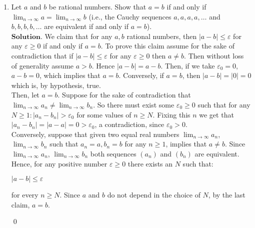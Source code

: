 \documentclass{article}
\theoremstyle{remark}
\begin{document}
\begin{enumerate}
        \item Let \( a \) and \( b \) be rational numbers. Show that \( a = b \) if and only if 
        \( \lim_{n \to \infty} a = \lim_{n \to \infty} b \) (i.e., the Cauchy sequences \( a, a, a, a, \dots \) and \( b, b, b, b, \dots \) are equivalent if and only if \( a = b \)).\\
        $\textbf{Solution.}$
        We claim that for any $a, b$ rational numbers, then $\left\lvert a-b\right\rvert \leq \varepsilon$ for any $\varepsilon \geq 0$ if and only
        if $a = b$. To prove this claim assume for the sake of contradiction that if 
        $\left\lvert a-b\right\rvert \leq \varepsilon$ for any $\varepsilon \geq 0$ then $a \neq b$.
        Then without loss of generality assume $a > b$. Hence $\left\lvert a-b\right\rvert = a-b$. Then, if we take $\varepsilon_0 = 0$,
        $a - b = 0$, which implies that $a = b$.
        Conversely, if $a=b$, then $\left\lvert a-b\right\rvert = \left\lvert 0\right\rvert = 0$
        which is, by hypothesis, true.\\
        Then, let $a = b$. Suppose for the sake of contradiction that $\lim_{n\to \infty}a_n \neq \lim_{n\to \infty}b_n$.
        So there must exist some $\varepsilon_0 \geq 0$ such that for any $N \geq 1: \left\lvert a_n - b_n \right\rvert > \varepsilon_0$ for some
        values of $n \geq N$. Fixing this $n$ we get that $\left\lvert a_n - b_n \right\rvert = \left\lvert a - a \right\rvert = 0 > \varepsilon_0$,
        a contradiction, since $\varepsilon_0 > 0$.\\
        Conversely, suppose that given two equal real numbers $\lim_{n \to \infty} a_n$, $\lim_{n \to \infty} b_n$
        such that $a_n = a, b_n = b$ for any $n \geq 1$, implies that $a \neq b$.
        Since $\lim_{n \to \infty} a_n$, $\lim_{n \to \infty} b_n$ both sequences $(a_n)$ and $(b_n)$ are equivalent.
        Hence, for any positive number $\varepsilon \geq 0$ there exists an $N$ such that:
        \begin{center}
            $\left\lvert a-b\right\rvert \leq \varepsilon$
        \end{center}
        for every $n \geq N$. Since $a$ and $b$ do not depend in the choice
        of $N$, by the last claim, $a = b$.
        \begin{flushright}
            \qed
        \end{flushright}


\end{enumerate}
\end{document}
